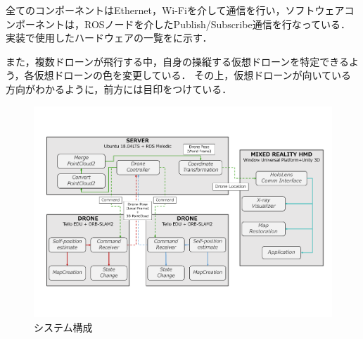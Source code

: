 \documentclass[a4paper,11pt]{ujreport}
\begin{document}
全てのコンポーネントはEthernet，Wi-Fiを介して通信を行い，ソフトウェアコンポーネントは，ROSノード\cite{ros}を介したPublish/Subscribe通信を行なっている．
実装で使用したハードウェアの一覧をに示す．

また，複数ドローンが飛行する中，自身の操縦する仮想ドローンを特定できるよう，各仮想ドローンの色を変更している．
その上，仮想ドローンが向いている方向がわかるように，前方には目印をつけている．

\begin{figure}[!tb]
  \centering
  \includegraphics[width=\linewidth]{img/04_system.pdf}
  \caption{システム構成}
  \label{fig:04_system}
\end{figure}
\end{document}
